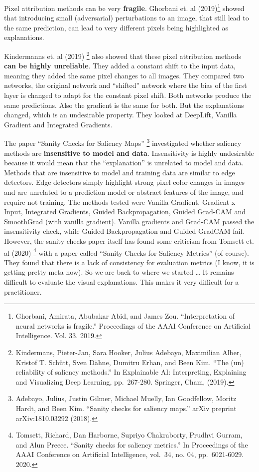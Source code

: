 \documentclass[
  12pt,
]{krantz}
\begin{document}
Pixel attribution methods can be very \textbf{fragile}.
Ghorbani et. al (2019)\footnote{Ghorbani, Amirata, Abubakar Abid, and James Zou. ``Interpretation of neural networks is fragile.'' Proceedings of the AAAI Conference on Artificial Intelligence. Vol. 33. 2019.} showed that introducing small (adversarial) perturbations to an image, that still lead to the same prediction, can lead to very different pixels being highlighted as explanations.

Kindermanns et. al (2019) \footnote{Kindermans, Pieter-Jan, Sara Hooker, Julius Adebayo, Maximilian Alber, Kristof T. Schütt, Sven Dähne, Dumitru Erhan, and Been Kim. ``The (un) reliability of saliency methods.'' In Explainable AI: Interpreting, Explaining and Visualizing Deep Learning, pp.~267-280. Springer, Cham, (2019).} also showed that these pixel attribution methods \textbf{can be highly unreliable}.
They added a constant shift to the input data, meaning they added the same pixel changes to all images.
They compared two networks, the original network and ``shifted'' network where the bias of the first layer is changed to adapt for the constant pixel shift.
Both networks produce the same predictions.
Also the gradient is the same for both.
But the explanations changed, which is an undesirable property.
They looked at DeepLift, Vanilla Gradient and Integrated Gradients.

The paper ``Sanity Checks for Saliency Maps'' \footnote{Adebayo, Julius, Justin Gilmer, Michael Muelly, Ian Goodfellow, Moritz Hardt, and Been Kim. ``Sanity checks for saliency maps.'' arXiv preprint arXiv:1810.03292 (2018).} investigated whether saliency methods are \textbf{insensitive to model and data}.
Insensitivity is highly undesirable because it would mean that the ``explanation'' is unrelated to model and data.
Methods that are insensitive to model and training data are similar to edge detectors.
Edge detectors simply highlight strong pixel color changes in images and are unrelated to a prediction model or abstract features of the image, and require not training.
The methods tested were Vanilla Gradient, Gradient x Input, Integrated Gradients, Guided Backpropagation, Guided Grad-CAM and SmoothGrad (with vanilla gradient).
Vanilla gradients and Grad-CAM passed the insensitivity check, while Guided Backpropagation and Guided GradCAM fail.
However, the sanity checks paper itself has found some criticism from Tomsett et. al (2020) \footnote{Tomsett, Richard, Dan Harborne, Supriyo Chakraborty, Prudhvi Gurram, and Alun Preece. ``Sanity checks for saliency metrics.'' In Proceedings of the AAAI Conference on Artificial Intelligence, vol.~34, no. 04, pp.~6021-6029. 2020.} with a paper called ``Sanity Checks for Saliency Metrics'' (of course).
They found that there is a lack of consistency for evaluation metrics (I know, it is getting pretty meta now).
So we are back to where we started \ldots{} It remains difficult to evaluate the visual explanations.
This makes it very difficult for a practitioner.
\end{document}

